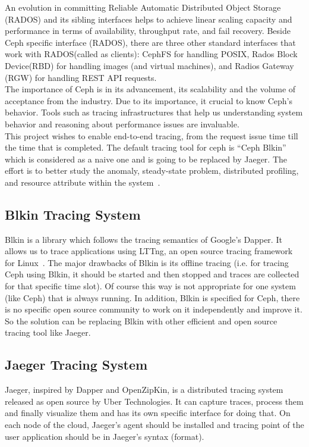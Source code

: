 \documentclass[a4paper, 11pt]{article}
\begin{document}
An evolution in committing Reliable Automatic Distributed Object Storage (RADOS) and its sibling interfaces helps to achieve linear scaling capacity and performance in terms of availability, throughput rate, and fail recovery. Beside Ceph specific interface (RADOS), there are three other standard interfaces that work with RADOS(called as clients): CephFS for handling POSIX, Rados Block Device(RBD) for handling images (and virtual machines), and Radios Gateway (RGW) for handling REST API requests.~\cite{key}\\

The importance of Ceph is in its advancement, its scalability and the volume of acceptance from the industry. Due to its importance, it crucial to know Ceph’s behavior. Tools such as tracing infrastructures that help us understanding system behavior and reasoning about performance issues are invaluable.\\

This project wishes to enable end-to-end tracing, from the request issue time till the time that is completed. The default tracing tool for ceph is “Ceph Blkin” which is considered as a naive one and is going to be replaced by Jaeger. The effort is to better study the anomaly, steady-state problem, distributed profiling, and resource attribute within the system~\cite{trace_dis}.

\subsection{Blkin Tracing System}
Blkin is a library which follows the tracing semantics of Google’s Dapper. It allows us to trace applications using LTTng, an open source tracing framework for Linux~\cite{ceph_blkin}. The major drawbacks of Blkin is its offline tracing (i.e. for tracing Ceph using Blkin, it should be started and then stopped and traces are collected for that specific time slot). Of course this way is not appropriate for one system (like Ceph) that is always running. In addition, Blkin is specified for Ceph, there is no specific open source community to work on it independently and improve it.  So the solution can be replacing Blkin with other efficient and open source tracing tool like Jaeger.

\subsection{Jaeger Tracing System}
Jaeger, inspired by Dapper and OpenZipKin, is a distributed tracing system released as open source by Uber Technologies. It can capture traces, process them and finally visualize them and has its own specific interface for doing that. On each node of the cloud, Jaeger’s agent should be installed and tracing point of the user application should be in Jaeger’s syntax (format).\\
\end{document}
